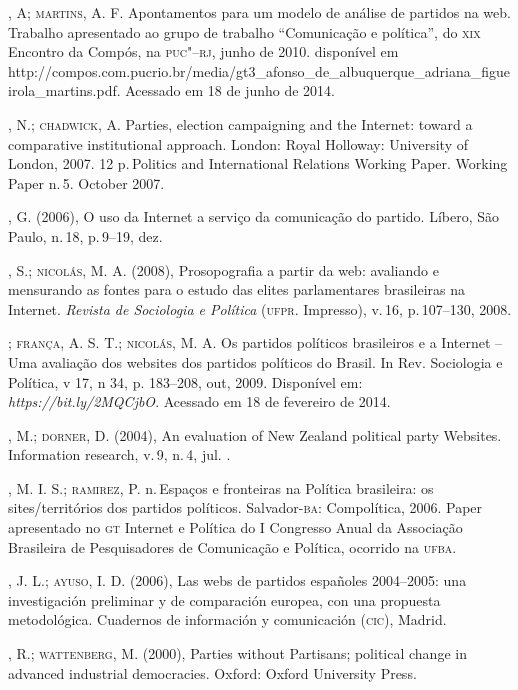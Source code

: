 \begin{bibliohedra}
, A; \textsc{martins}, A. F. Apontamentos para um modelo de análise
de partidos na web. Trabalho apresentado ao grupo de trabalho
``Comunicação e política'', do \textsc{xix} Encontro da Compós, na \textsc{puc"--rj}, junho
de 2010. disponível em
http://compos.com.pucrio.br/media/gt3\_afonso\_de\_albuquerque\_adriana\_figueirola\_martins.pdf.
Acessado em 18 de junho de 2014.

, N.; \textsc{chadwick}, A. Parties, election campaigning and the
Internet: toward a comparative institutional approach. London: Royal
Holloway: University of London, 2007. 12 p.\,Politics and International
Relations Working Paper. Working Paper n.\,5. October 2007.

, G. (2006), O uso da Internet a serviço da comunicação do
partido. Líbero, São Paulo, n.\,18, p.\,9--19, dez.

, S.; \textsc{nicolás}, M. A. (2008), Prosopografia a partir da web:
avaliando e mensurando as fontes para o estudo das elites parlamentares
brasileiras na Internet. \emph{Revista de Sociologia e Política} (\textsc{ufpr}.
Impresso), v.\,16, p.\,107--130, 2008.

\titidem; \textsc{frança}, A. S. T.; \textsc{nicolás}, M. A. Os partidos políticos
brasileiros e a Internet -- Uma avaliação dos websites dos partidos
políticos do Brasil. In Rev. Sociologia e Política, v 17, n 34, p.
183--208, out, 2009. Disponível em:
\emph{https://bit.ly/2MQCjbO}. Acessado em 18 de
fevereiro de 2014.

, M.; \textsc{dorner}, D. (2004), An evaluation of New Zealand political
party Websites. Information research, v.\,9, n.\,4, jul. .

, M. I. S.; \textsc{ramirez}, P. n.\,Espaços e fronteiras na Política
brasileira: os sites/territórios dos partidos políticos. Salvador-\textsc{ba}:
Compolítica, 2006. Paper apresentado no \textsc{gt} Internet e Política do I
Congresso Anual da Associação Brasileira de Pesquisadores de Comunicação
e Política, ocorrido na \textsc{ufba}.

, J. L.; \textsc{ayuso}, I. D. (2006), Las webs de partidos españoles
2004--2005: una investigación preliminar y de comparación europea, con
una propuesta metodológica. Cuadernos de información y comunicación
(\textsc{cic}), Madrid.

, R.; \textsc{wattenberg}, M. (2000), Parties without Partisans; political
change in advanced industrial democracies. Oxford: Oxford University
Press.


\end{bibliohedra}
